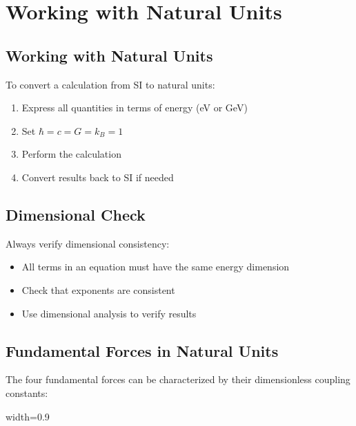 	\section{Working with Natural Units}
	
	\subsection{Working with Natural Units}
	
	To convert a calculation from SI to natural units:
	\begin{enumerate}
		\item Express all quantities in terms of energy (eV or GeV)
		\item Set $\hbar = c = G = k_B = 1$
		\item Perform the calculation
		\item Convert results back to SI if needed
	\end{enumerate}
	
	\subsection{Dimensional Check}
	
	Always verify dimensional consistency:
	\begin{itemize}
		\item All terms in an equation must have the same energy dimension
		\item Check that exponents are consistent
		\item Use dimensional analysis to verify results
	\end{itemize}
	
	\subsection{Fundamental Forces in Natural Units}
	
	The four fundamental forces can be characterized by their dimensionless coupling constants:
	
	\begin{table}[htbp]
		\centering
		\begin{adjustbox}{width=0.9\textwidth}
		\end{adjustbox}
		\caption{Fundamental forces characterized by coupling constants}
		\label{tab:forces}
	\end{table}
	
